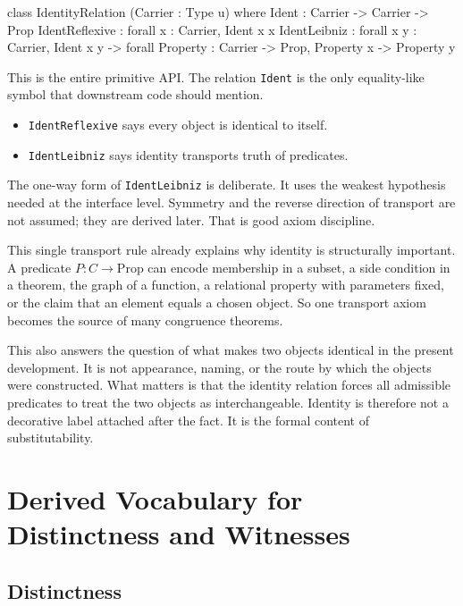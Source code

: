 \documentclass[11pt]{article}
\newcommand{\leaninline}[1]{\texttt{#1}}
\begin{document}
\begin{leanblock}
class IdentityRelation (Carrier : Type u) where
  Ident : Carrier -> Carrier -> Prop
  IdentReflexive : forall x : Carrier, Ident x x
  IdentLeibniz : forall {x y : Carrier}, Ident x y ->
    forall Property : Carrier -> Prop, Property x -> Property y
\end{leanblock}

This is the entire primitive API. The relation \leaninline{Ident} is the only equality-like symbol that downstream code should mention.

\begin{itemize}[leftmargin=1.5em]
\item \leaninline{IdentReflexive} says every object is identical to itself.
\item \leaninline{IdentLeibniz} says identity transports truth of predicates.
\end{itemize}

The one-way form of \leaninline{IdentLeibniz} is deliberate. It uses the weakest hypothesis needed at the interface level. Symmetry and the reverse direction of transport are not assumed; they are derived later. That is good axiom discipline.

This single transport rule already explains why identity is structurally important. A predicate \(P : C \to \mathrm{Prop}\) can encode membership in a subset, a side condition in a theorem, the graph of a function, a relational property with parameters fixed, or the claim that an element equals a chosen object. So one transport axiom becomes the source of many congruence theorems.

This also answers the question of what makes two objects identical in the present development. It is not appearance, naming, or the route by which the objects were constructed. What matters is that the identity relation forces all admissible predicates to treat the two objects as interchangeable. Identity is therefore not a decorative label attached after the fact. It is the formal content of substitutability.

\section{Derived Vocabulary for Distinctness and Witnesses}

\subsection{Distinctness}
\end{document}
